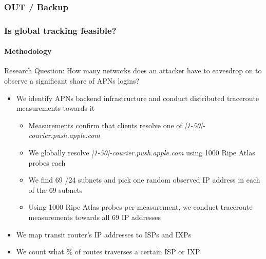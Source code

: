 
\begin{frame}
\frametitle{OUT / Backup}
\end{frame}
\clearpage


\begin{frame}
	\frametitle{Is global tracking feasible?}
	\framesubtitle{Methodology}
	Research Question: How many networks does an attacker have to eavesdrop on to observe a significant share of APNs logins?
	\begin{itemize}
		\item We identify APNs backend infrastructure and conduct distributed traceroute \\ measurements towards it
		\begin{itemize}
		\item Measurements confirm that clients resolve one of \textit{[1-50]-courier.push.apple.com}
		\item We globally resolve \textit{[1-50]-courier.push.apple.com} using 1000 Ripe Atlas probes each
		\item We find 69 /24 subnets and pick one random observed IP address in each of the 69 subnets
		\item Using 1000 Ripe Atlas probes per measurement, we conduct traceroute measurements towards all 69 IP addresses
		\end{itemize}
		\item We map transit router's IP addresses to ISPs and IXPs 
		\item We count what \% of routes traverses a certain ISP or IXP
	\end{itemize}	
\end{frame}

